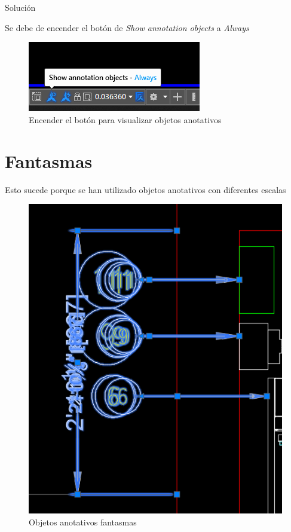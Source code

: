 \documentclass[12pt,letterpaper,final]{report}
\begin{document}
{\LARGE Solución}

Se debe de encender el botón de \emph{Show annotation objects} a \emph{Always}

\begin{figure}[H]
	\centering
	\includegraphics[width=0.85\linewidth, height=0.5\textheight,keepaspectratio]{Imagenes/apendice_anotative_02}
	\caption{Encender el botón para visualizar objetos anotativos}
	\label{fig:apendiceanotative02}
\end{figure}

\pagebreak

\section{Fantasmas}

Esto sucede porque se han utilizado objetos anotativos con diferentes escalas

\begin{figure}[H]
	\centering
	\includegraphics[width=0.85\linewidth, height=0.5\textheight,keepaspectratio]{Imagenes/apendice_anotative_03}
	\caption{Objetos anotativos fantasmas}
	\label{fig:apendiceanotative03}
\end{figure}
\end{document}
